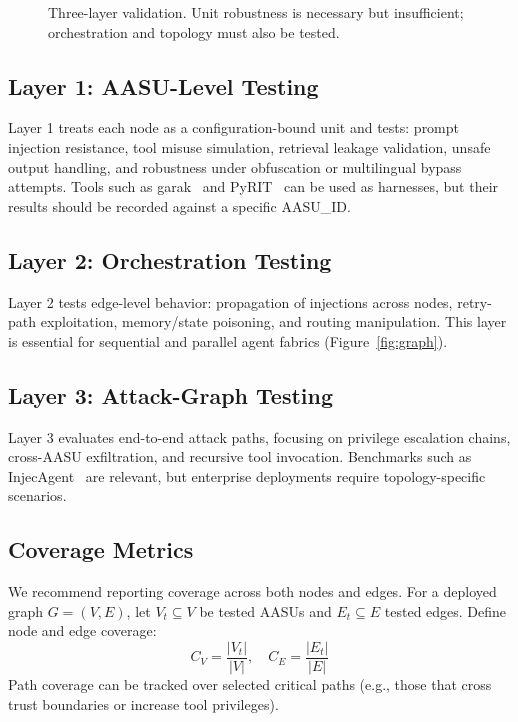 \documentclass[11pt]{article}
\newcommand{\AASU}{\textsc{AASU}}
\newcommand{\AASUs}{\AASU{}s}
\begin{document}
\begin{figure}[t]
  \centering
  \caption{Three-layer validation. Unit robustness is necessary but insufficient; orchestration and topology must also be tested.}
  \label{fig:layers}
\end{figure}

\subsection{Layer 1: \AASU-Level Testing}
Layer 1 treats each node as a configuration-bound unit and tests:
prompt injection resistance, tool misuse simulation, retrieval leakage validation, unsafe output handling, and robustness under obfuscation or multilingual bypass attempts.
Tools such as garak~\cite{garak} and PyRIT~\cite{pyrit} can be used as harnesses, but their results should be recorded against a specific \AASU\_ID.

\subsection{Layer 2: Orchestration Testing}
Layer 2 tests edge-level behavior: propagation of injections across nodes, retry-path exploitation, memory/state poisoning, and routing manipulation.
This layer is essential for sequential and parallel agent fabrics (Figure~\ref{fig:graph}).

\subsection{Layer 3: Attack-Graph Testing}
Layer 3 evaluates end-to-end attack paths, focusing on privilege escalation chains, cross-\AASU{} exfiltration, and recursive tool invocation.
Benchmarks such as InjecAgent~\cite{injecagent} are relevant, but enterprise deployments require topology-specific scenarios.

\subsection{Coverage Metrics}
We recommend reporting coverage across both nodes and edges. For a deployed graph $G=(V,E)$, let $V_t\subseteq V$ be tested \AASUs{} and $E_t\subseteq E$ tested edges.
Define node and edge coverage:
\begin{equation}
  C_V = \frac{|V_t|}{|V|}, \quad
  C_E = \frac{|E_t|}{|E|}
\end{equation}
Path coverage can be tracked over selected critical paths (e.g., those that cross trust boundaries or increase tool privileges).
\end{document}
